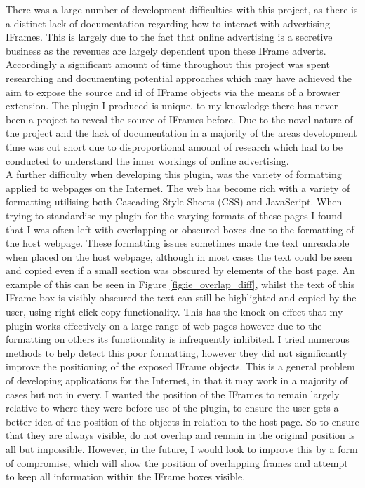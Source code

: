 \documentclass[12pt]{article}
\begin{document}
There was a large number of development difficulties with this project, as there is a distinct lack of documentation regarding how to interact with advertising IFrames. This is largely due to the fact that online advertising is a secretive business as the revenues are largely dependent upon these IFrame adverts. Accordingly a significant amount of time throughout this project was spent researching and documenting potential approaches which may have achieved the aim to expose the source and id of IFrame objects via the means of a browser extension. The plugin I produced is unique, to my knowledge there has never been a project to reveal the source of IFrames before. Due to the novel nature of the project and the lack of documentation in a majority of the areas development time was cut short due to disproportional amount of research which had to be conducted to understand the inner workings of online advertising. \\

A further difficulty when developing this plugin, was the variety of formatting applied to webpages on the Internet. The web has become rich with a variety of formatting utilising both Cascading Style Sheets (CSS) and JavaScript. When trying to standardise my plugin for the varying formats of these pages I found that I was often left with overlapping or obscured boxes due to the formatting of the host webpage. These formatting issues sometimes made the text unreadable when placed on the host webpage, although in most cases the text could be seen and copied even if a small section was obscured by elements of the host page. An example of this can be seen in Figure \ref{fig:ie_overlap_diff}, whilst the text of this IFrame box is visibly obscured the text can still be highlighted and copied by the user, using right-click copy functionality. This has the knock on effect that my plugin works effectively on a large range of web pages however due to the formatting on others its functionality is infrequently inhibited. I tried numerous methods to help detect this poor formatting, however they did not significantly improve the positioning of the exposed IFrame objects. This is a general problem of developing applications for the Internet, in that it may work in a majority of cases but not in every. I wanted the position of the IFrames to remain largely relative to where they were before use of the plugin, to ensure the user gets a better idea of the position of the objects in relation to the host page. So to ensure that they are always visible, do not overlap and remain in the original position is all but impossible. However,  in the future, I would look to improve this by a form of compromise, which will show the position of overlapping frames and attempt to keep all information within the IFrame boxes visible. \\
\end{document}
